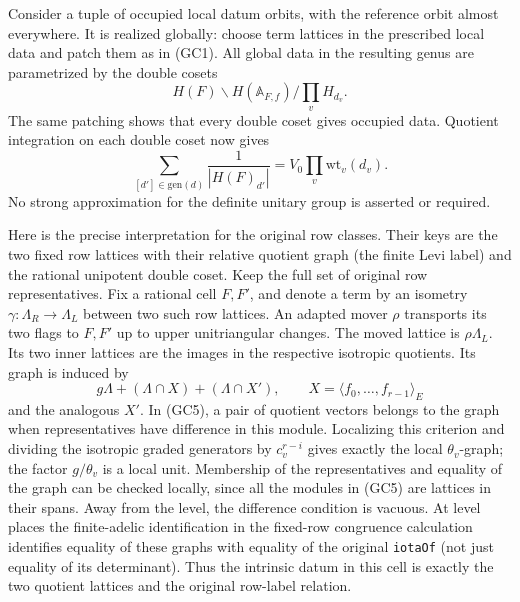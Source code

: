 Consider a tuple of occupied local datum orbits, with the
reference orbit almost everywhere. It is realized globally:
choose term lattices in the prescribed local data and patch
them as in (GC1). All global data in the resulting genus are
parametrized by the double cosets
\[
          H(F)\backslash H(\mathbb A_{F,f})/\prod_v H_{d_v}.
\]
The same patching shows that every double coset gives occupied
data. Quotient integration on each double coset now gives
\[
 \sum_{[d']\in\mathrm{gen}(d)}
              \frac1{|H(F)_{d'}|}
           =V_0\prod_v\mathrm{wt}_v(d_v).
 \tag{GC4}
\]
No strong approximation for the definite unitary group is
asserted or required.

Here is the precise interpretation for the original row
classes. Their keys are the two fixed row lattices with their
relative quotient graph (the finite Levi label) and the
rational unipotent double coset. Keep the full set of original
row representatives. Fix a rational cell \(F,F'\), and denote
a term by an isometry \(\gamma:\Lambda_R\to\Lambda_L\) between
two such row lattices. An adapted mover \(\rho\) transports its
two flags to \(F,F'\) up to upper unitriangular changes.
The moved lattice is \(\rho\Lambda_L\).
Its two inner lattices are the images in the respective
isotropic quotients. Its graph is induced by
\[
       g\Lambda+(\Lambda\cap X)+(\Lambda\cap X'),
       \qquad X=\langle f_0,\ldots,f_{r-1}\rangle_E
 \tag{GC5}
\]
and the analogous \(X'\). In (GC5), a pair of quotient vectors
belongs to the graph when representatives have difference in
this module. Localizing this criterion and dividing the
isotropic graded generators by \(c_v^{r-i}\) gives exactly
the local \(\theta_v\)-graph; the factor \(g/\theta_v\) is a
local unit. Membership of the representatives and equality of
the graph can be checked locally, since all the modules in
(GC5) are lattices in their spans. Away from the level, the
difference condition is vacuous. At level places the
finite-adelic identification in the fixed-row congruence
calculation identifies equality of these graphs with equality
of the original \texttt{iotaOf} (not just equality of its
determinant). Thus the intrinsic datum in this cell is exactly
the two quotient lattices and the original row-label relation.

